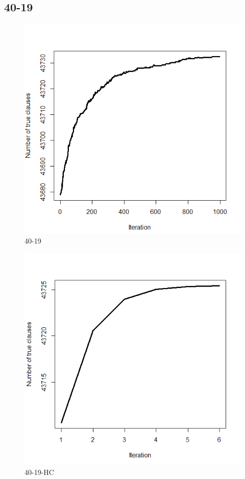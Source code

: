 \documentclass{article}
\begin{document}
\subsection{40-19}
\begin{figure}[H]
  \includegraphics[width=\linewidth]{40-19.png}
  \caption{40-19}
\end{figure}
\begin{figure}[H]
  \includegraphics[width=\linewidth]{40-19-HC.png}
  \caption{40-19-HC}
\end{figure}
\end{document}
